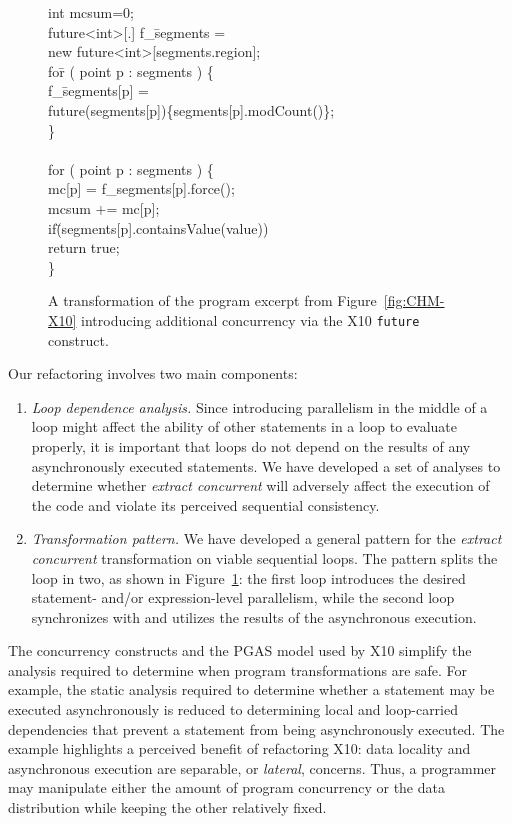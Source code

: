 \documentclass[natbib]{sigplanconf}
\newenvironment{code}{\begin{center}\begin{small}\begin{tt}\begin{tabbing}}
{\end{tabbing}\end{tt}\end{small}\end{center}}
\begin{document}
\begin{figure}[tp]
  \begin{code}
int mcsum=0; \\
future<int>[.] f\_\=segments = \\
\>new future<int>[segments.region]; \\
fo\=r ( point p : segments ) \{ \\
\>  f\_\=segments[p] = \\
\>\>future(segments[p])\{segments[p].modCount()\}; \\
\} \\ \\
for ( point p : segments ) \{ \\
\>  mc[p] = f\_segments[p].force(); \\
\>  mcsum += mc[p]; \\
\>  if\=(segments[p].containsValue(value)) \\
\>\>    return true; \\
\} 
  \end{code}
\caption{\label{fig:CHM-X10-future} A transformation of the program excerpt 
from Figure~\ref{fig:CHM-X10} introducing additional concurrency via the 
X10 {\tt future} construct.}
\end{figure}

Our refactoring involves two main components:
\begin{enumerate}
\item {\em Loop dependence analysis.} Since introducing parallelism in
the middle of a loop might affect the ability of other statements in a
loop to evaluate properly, it is important that loops do not depend
on the results of any asynchronously executed statements. We
have developed a set of analyses to determine whether {\em extract
concurrent} will adversely affect the execution of the code and
violate its perceived sequential consistency.

\item {\em Transformation pattern.} We have developed a general
pattern for the {\em extract concurrent} transformation on viable
sequential loops.
The pattern splits the loop in two, as shown in Figure~\ref{fig:CHM-X10-future}: the
first loop introduces the desired statement- and/or expression-level
parallelism, while the second loop synchronizes with and utilizes the
results of the asynchronous execution.
\end{enumerate}

The concurrency
constructs and the PGAS model used by X10 simplify the analysis required to determine
when program transformations are safe. For example, the static analysis required to
determine whether a statement may be executed asynchronously is
reduced to determining local and loop-carried dependencies that prevent a
statement from being asynchronously executed. The example highlights a perceived benefit of
refactoring X10: data locality and asynchronous execution are separable, or
{\em lateral}, concerns. Thus, a programmer may manipulate either the amount of
program concurrency or the data distribution while keeping the other relatively
fixed.
\end{document}
